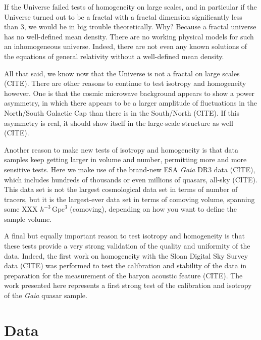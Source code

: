 \documentclass[modern]{aastex631}
\newcommand{\unit}[1]{\mathrm{#1}}
\newcommand{\Gpc}{\unit{Gpc}}
\begin{document}
If the Universe failed tests of homogeneity on large scales, and in particular if the Universe turned out to be a fractal with a fractal dimension significantly less than 3, we would be in big trouble theoretically.
Why?
Because a fractal universe has no well-defined mean density.
There are no working physical models for such an inhomogeneous universe.
Indeed, there are not even any known solutions of the equations of general relativity without a well-defined mean density.

All that said, we know now that the Universe is not a fractal on large scales (CITE).
There are other reasons to continue to test isotropy and homogeneity however.
One is that the cosmic microwave background appears to show a power asymmetry, in which there appears to be a larger amplitude of fluctuations in the North/South Galactic Cap than there is in the South/North (CITE).
If this asymmetry is real, it should show itself in the large-scale structure as well (CITE).

Another reason to make new tests of isotropy and homogeneity is that data samples keep getting larger in volume and number, permitting more and more sensitive tests.
Here we make use of the brand-new ESA \textsl{Gaia} DR3 data (CITE), which includes hundreds of thousands or even millions of quasars, all-sky (CITE).
This data set is not the largest cosmological data set in terms of number of tracers, but it is the largest-ever data set in terms of comoving volume, spanning some XXX $h^{-3}\,\Gpc^3$ (comoving), depending on how you want to define the sample volume.

A final but equally important reason to test isotropy and homogeneity is that these tests provide a very strong validation of the quality and uniformity of the data.
Indeed, the first work on homogeneity with the Sloan Digital Sky Survey data (CITE) was performed to test the calibration and stability of the data in preparation for the measurement of the baryon acoustic feature (CITE).
The work presented here represents a first strong test of the calibration and isotropy of the \textsl{Gaia} quasar sample.

\section{Data}
\end{document}
